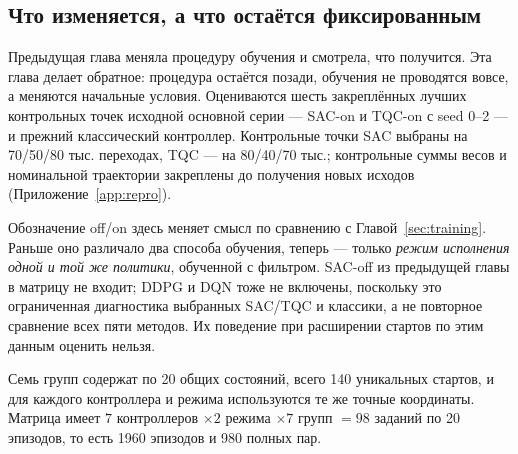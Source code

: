 \label{sec:robust}
\subsection{Что изменяется, а что остаётся фиксированным}
Предыдущая глава меняла процедуру обучения и смотрела, что получится. Эта глава делает обратное: процедура остаётся позади, обучения не проводятся вовсе, а меняются начальные условия. Оцениваются шесть закреплённых лучших контрольных точек исходной основной серии — SAC-on и TQC-on с seed 0–2 — и прежний классический контроллер. Контрольные точки SAC выбраны на 70/50/80 тыс. переходах, TQC — на 80/40/70 тыс.; контрольные суммы весов и номинальной траектории закреплены до получения новых исходов (Приложение~\ref{app:repro}).

Обозначение off/on здесь меняет смысл по сравнению с Главой~\ref{sec:training}. Раньше оно различало два способа обучения, теперь — только \emph{режим исполнения одной и той же политики}, обученной с фильтром. SAC-off из предыдущей главы в матрицу не входит; DDPG и DQN тоже не включены, поскольку это ограниченная диагностика выбранных SAC/TQC и классики, а не повторное сравнение всех пяти методов. Их поведение при расширении стартов по этим данным оценить нельзя.

Семь групп содержат по 20 общих состояний, всего 140 уникальных стартов, и для каждого контроллера и режима используются те же точные координаты. Матрица имеет $7$ контроллеров $\times2$ режима $\times7$ групп $=98$ заданий по 20 эпизодов, то есть 1960 эпизодов и 980 полных пар.

